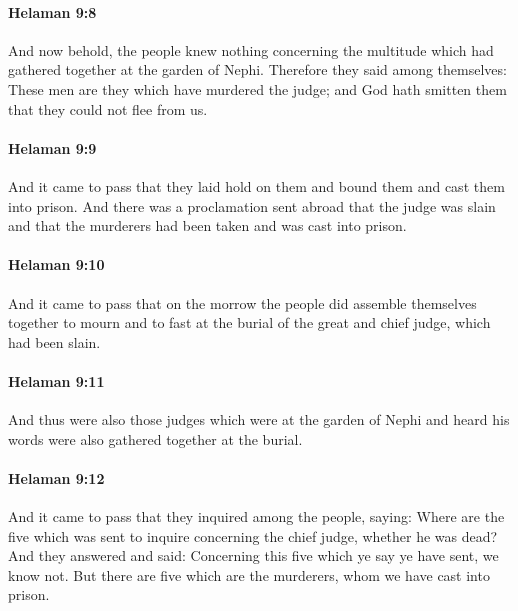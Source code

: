 		\paragraph{Helaman 9:8} %
			\label{HELAMAN-9-8}

			And now behold, the people knew nothing concerning the multitude
			which had gathered together at the garden of Nephi.
			Therefore they said among themselves:
			These men are they which have murdered the judge;
			and God hath smitten them that they could not flee from us.

		\paragraph{Helaman 9:9} %
			\label{HELAMAN-9-9}

			And it came to pass that they laid hold on them
			and bound them and cast them into prison.
			And there was a proclamation sent abroad
			that the judge was slain
			and that the murderers had been taken and was cast into prison.

		\paragraph{Helaman 9:10} %
			\label{HELAMAN-9-10}

			And it came to pass that on the morrow
			the people did assemble themselves together to mourn and to fast
			at the burial of the great and chief judge, which had been slain.

		\paragraph{Helaman 9:11} %
			\label{HELAMAN-9-11}

			And thus were also those judges
			which were at the garden of Nephi and heard his words
			were also gathered together at the burial.

		\paragraph{Helaman 9:12} %
			\label{HELAMAN-9-12}

			And it came to pass that they inquired among the people, saying:
			Where are the five which was sent to inquire concerning the chief judge,
			whether he was dead?
			And they answered and said:
			Concerning this five which ye say ye have sent, we know not.
			But there are five which are the murderers,
			whom we have cast into prison.

